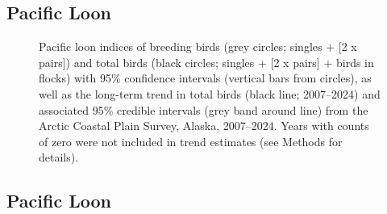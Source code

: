 \documentclass[
]{article}
\begin{document}
\newpage{}

\subsection*{Pacific Loon}\label{pacific-loon}

\begin{figure}


\caption{\label{fig-PALO}Pacific loon indices of breeding birds (grey
circles; singles + {[}2 x pairs{]}) and total birds (black circles;
singles + {[}2 x pairs{]} + birds in flocks) with 95\% confidence
intervals (vertical bars from circles), as well as the long-term trend
in total birds (black line; 2007--2024) and associated 95\% credible
intervals (grey band around line) from the Arctic Coastal Plain Survey,
Alaska, 2007--2024. Years with counts of zero were not included in trend
estimates (see Methods for details).}

\end{figure}%

\newpage{}

\subsection*{Pacific Loon}\label{pacific-loon-1}

\begingroup\fontsize{10}{12}\selectfont
\end{document}
